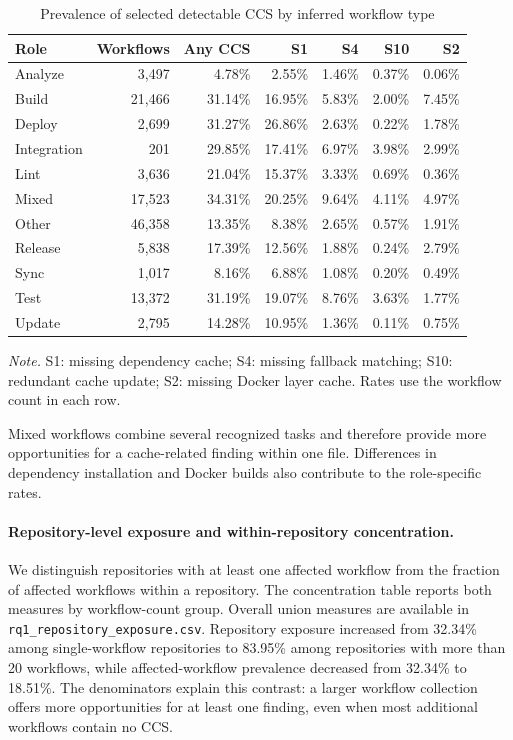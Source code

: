 \documentclass[smallextended]{svjour3}
\begin{document}
\begin{table}[htbp]\caption{Prevalence of selected detectable CCS by inferred workflow type}\label{tab:workflow-role-distribution}\centering\footnotesize
\begin{tabular}{lrrrrrr}\hline
Role & Workflows & Any CCS & S1 & S4 & S10 & S2\\\hline
Analyze & 3,497 & 4.78\% & 2.55\% & 1.46\% & 0.37\% & 0.06\% \\
Build & 21,466 & 31.14\% & 16.95\% & 5.83\% & 2.00\% & 7.45\% \\
Deploy & 2,699 & 31.27\% & 26.86\% & 2.63\% & 0.22\% & 1.78\% \\
Integration & 201 & 29.85\% & 17.41\% & 6.97\% & 3.98\% & 2.99\% \\
Lint & 3,636 & 21.04\% & 15.37\% & 3.33\% & 0.69\% & 0.36\% \\
Mixed & 17,523 & 34.31\% & 20.25\% & 9.64\% & 4.11\% & 4.97\% \\
Other & 46,358 & 13.35\% & 8.38\% & 2.65\% & 0.57\% & 1.91\% \\
Release & 5,838 & 17.39\% & 12.56\% & 1.88\% & 0.24\% & 2.79\% \\
Sync & 1,017 & 8.16\% & 6.88\% & 1.08\% & 0.20\% & 0.49\% \\
Test & 13,372 & 31.19\% & 19.07\% & 8.76\% & 3.63\% & 1.77\% \\
Update & 2,795 & 14.28\% & 10.95\% & 1.36\% & 0.11\% & 0.75\% \\\hline
\end{tabular}\par\smallskip\parbox{\linewidth}{\footnotesize\emph{Note.} S1: missing dependency cache; S4: missing fallback matching; S10: redundant cache update; S2: missing Docker layer cache. Rates use the workflow count in each row.}\end{table}

Mixed workflows combine several recognized tasks and therefore provide more opportunities for a cache-related finding within one file. Differences in dependency installation and Docker builds also contribute to the role-specific rates.

\paragraph{Repository-level exposure and within-repository concentration.} We distinguish repositories with at least one affected workflow from the fraction of affected workflows within a repository. The concentration table reports both measures by workflow-count group. Overall union measures are available in \texttt{rq1\_repository\_exposure.csv}. Repository exposure increased from 32.34\% among single-workflow repositories to 83.95\% among repositories with more than 20 workflows, while affected-workflow prevalence decreased from 32.34\% to 18.51\%. The denominators explain this contrast: a larger workflow collection offers more opportunities for at least one finding, even when most additional workflows contain no CCS.
\end{document}
